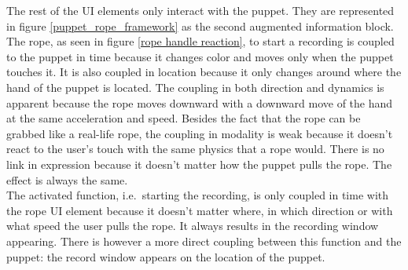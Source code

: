 The rest of the UI elements only interact with the puppet. They are represented in figure \ref{puppet_rope_framework} as the second augmented information block. The rope, as seen in figure \ref{rope handle reaction}, to start a recording is coupled to the puppet in time because it changes color and moves only when the puppet touches it. It is also coupled in location because it only changes around where the hand of the puppet is located. The coupling in both direction and dynamics is apparent because the rope moves downward with a downward move of the hand at the same acceleration and speed. Besides the fact that the rope can be grabbed like a real-life rope, the coupling in modality is weak because it doesn't react to the user's touch with the same physics that a rope would. There is no link in expression because it doesn't matter how the puppet pulls the rope. The effect is always the same.\\


The activated function, i.e.\ starting the recording, is only coupled in time with the rope UI element because it doesn't matter where, in which direction or with what speed the user pulls the rope. It always results in the recording window appearing. There is however a more direct coupling between this function and the puppet: the record window appears on the location of the puppet.

